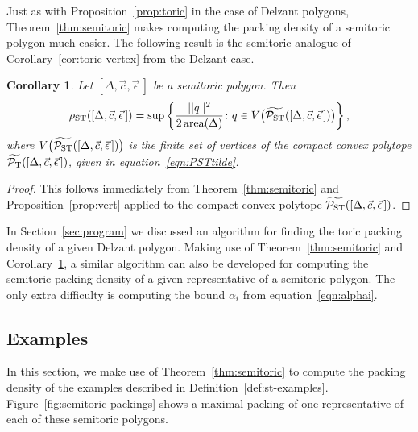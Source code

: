 \documentclass[pdftex]{sigma}
\numberwithin{equation}{section}
\newtheorem{Corollary}[Theorem]{Corollary}
\newcommand{\De}{\Delta}
\newcommand{\area}{\operatorname{area}}
\newcommand{\PT}{\mathcal{P}_{\rm T}}
\newcommand{\PTtilde}{\widetilde{\PT}}
\newcommand{\PSTtilde}{\widetilde{\mathcal{P}_{\rm ST}}}
\newcommand{\stpoly}{[\De,\vec{c},\vec{\epsilon}\,]}
\begin{document}
Just as with Proposition~\ref{prop:toric} in the case of Delzant polygons, Theorem~\ref{thm:semitoric} makes computing the packing density of a semitoric polygon much easier.
The following result is the semitoric analogue of Corollary~\ref{cor:toric-vertex} from the Delzant case.



\begin{Corollary} \label{cor:semitoric-vertex}
 Let $\stpoly$ be a semitoric polygon.
 Then
 \[
 \rho_{{\rm ST}} (\stpoly) = \sup \left\{ \frac{||q||^2}{2 \area(\De)}\colon q\in V\big(\PSTtilde(\stpoly)\big)\right\},
 \]
 where $V\big(\PSTtilde(\stpoly)\big)$ is the finite set of vertices of the compact convex polytope $\PTtilde(\stpoly)$, given in equation~\eqref{eqn:PSTtilde}.
 \end{Corollary}

\begin{proof}This follows immediately from Theorem~\ref{thm:semitoric} and Proposition~\ref{prop:vert} applied to the compact convex polytope $\PSTtilde(\stpoly)$.
\end{proof}

\begin{Remark}
 In Section~\ref{sec:program} we discussed an algorithm for finding the toric packing density of a given Delzant polygon.
 Making use of Theorem~\ref{thm:semitoric} and Corollary~\ref{cor:semitoric-vertex}, a similar algorithm can also be developed for computing the semitoric packing density of a given representative of a semitoric polygon.
 The only extra difficulty is computing the bound $\alpha_i$ from equation~\eqref{eqn:alphai}.
\end{Remark}







\subsection{Examples}\label{sec:pack-st-examples}
In this section, we make use of Theorem~\ref{thm:semitoric} to compute the packing density of the examples described in Definition~\ref{def:st-examples}.
Figure~\ref{fig:semitoric-packings} shows a maximal packing of one representative of each of these semitoric polygons.
\end{document}
